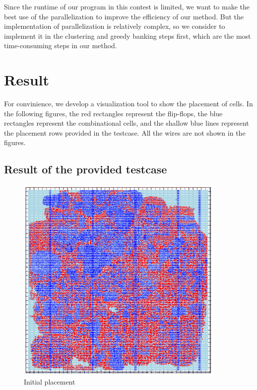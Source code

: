 \documentclass[12pt]{article}
\begin{document}
Since the runtime of our program in this contest is limited, we want to make the best use of the parallelization to improve the efficiency of our method. But the implementation of parallelization is relatively complex, so we consider to implement it in the clustering and greedy banking steps first, which are the most time-consuming steps in our method.


\section{Result}

For convinience, we develop a visualization tool to show the placement of cells. In the following figures, the red rectangles represent the flip-flops, the blue rectangles represent the combinational cells, and the shallow blue lines represent the placement rows provided in the testcase. All the wires are not shown in the figures.

\newpage

\subsection{Result of the provided testcase}

\begin{figure}[htbp]
    \centering
    \includegraphics[width=0.9\textwidth]{results/init.png}
    \caption{Initial placement}
\end{figure}
\end{document}
